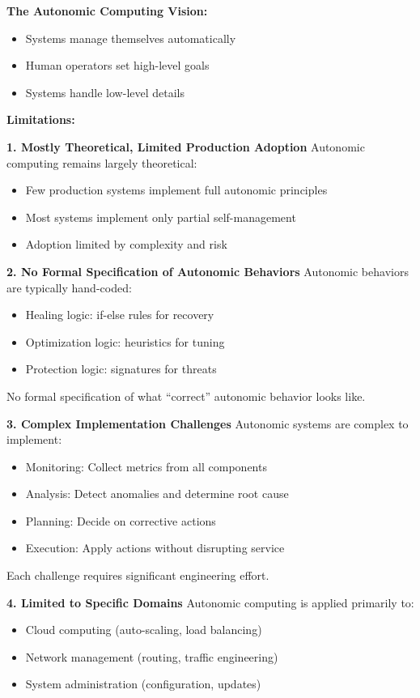 \textbf{The Autonomic Computing Vision:}
\begin{itemize}
    \item Systems manage themselves automatically
    \item Human operators set high-level goals
    \item Systems handle low-level details
\end{itemize}

\textbf{Limitations:}

\textbf{1. Mostly Theoretical, Limited Production Adoption}
Autonomic computing remains largely theoretical:
\begin{itemize}
    \item Few production systems implement full autonomic principles
    \item Most systems implement only partial self-management
    \item Adoption limited by complexity and risk
\end{itemize}

\textbf{2. No Formal Specification of Autonomic Behaviors}
Autonomic behaviors are typically hand-coded:
\begin{itemize}
    \item Healing logic: if-else rules for recovery
    \item Optimization logic: heuristics for tuning
    \item Protection logic: signatures for threats
\end{itemize}

No formal specification of what ``correct'' autonomic behavior looks like.

\textbf{3. Complex Implementation Challenges}
Autonomic systems are complex to implement:
\begin{itemize}
    \item Monitoring: Collect metrics from all components
    \item Analysis: Detect anomalies and determine root cause
    \item Planning: Decide on corrective actions
    \item Execution: Apply actions without disrupting service
\end{itemize}

Each challenge requires significant engineering effort.

\textbf{4. Limited to Specific Domains}
Autonomic computing is applied primarily to:
\begin{itemize}
    \item Cloud computing (auto-scaling, load balancing)
    \item Network management (routing, traffic engineering)
    \item System administration (configuration, updates)
\end{itemize}

